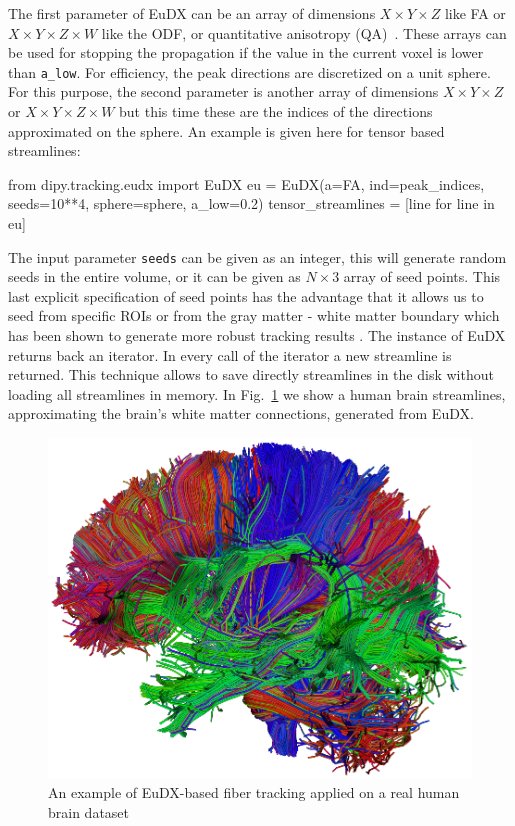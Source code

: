 \documentclass{bioinfo}
\begin{document}
The first parameter of EuDX can be an array of dimensions $X\times Y\times Z$
like FA or $X\times Y\times Z \times W$ like the ODF, or quantitative
anisotropy (QA)~\citep{yeh-etal:10}. These arrays can be used for stopping the
propagation if the value in the current voxel is lower than
\texttt{a\_low}. For efficiency, the peak directions are discretized on a unit
sphere. For this purpose, the second parameter is another array of dimensions
$X\times Y\times Z$ or $X\times Y\times Z\times W$ but this time these are the
indices of the directions approximated on the sphere. An example is given here
for tensor based streamlines:
\begin{python}
from dipy.tracking.eudx import EuDX
eu = EuDX(a=FA, ind=peak_indices, seeds=10**4,
          sphere=sphere, a_low=0.2)
tensor_streamlines = [line for line in eu]
\end{python}
The input parameter \texttt{seeds} can be given as an integer, this will
generate random seeds in the entire volume, or it can be given as $N\times 3$
array of seed points. This last explicit specification of seed points has the
advantage that it allows us to seed from specific ROIs or from the gray matter
- white matter boundary which has been shown to generate more robust tracking
results \citep{Cote2013tractometer}. The instance of EuDX returns back an
iterator. In every call of the iterator a new streamline is returned. This
technique allows to save directly streamlines in the disk without loading all
streamlines in memory. In Fig.~\ref{Fig:pretty_streamlines} we show a human
brain streamlines, approximating the brain's white matter connections, generated
from EuDX.

\begin{figure}
\includegraphics[scale=0.75]{Figures/pretty_streamlines.eps}
\centering{}
\caption{An example of EuDX-based fiber tracking applied on a real
  human brain dataset\label{Fig:pretty_streamlines}}
\end{figure}
\end{document}

